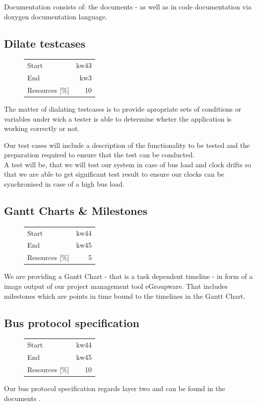 Documentation consists of: the documents \cite [NESD1]{NESD1} - \cite [NESD5]{NESD5} 
as well as in code documentation via doxygen documentation language.

\subsection{Dilate testcases}
\begin{figure}
\begin{tabular}[t]{|lr|}
\hline
Start & kw43\\
End & kw3\\
Resources [\%] & 10\\
\hline
\end{tabular}
\end{figure}
The matter of dialating testcases is to provide apropriate sets of conditions or variables under wich
a tester is able to determine wheter the application is working correctly or not.

Our test cases will include a description of the functionality to be tested and the preparation required
to ensure that the test can be conducted.\\
A test will be, that we will test our system in case of bus load and clock drifts so that we are able to get
significant test result to ensure our clocks can be synchronised in case of a high bus load.

\subsection{Gantt Charts \& Milestones}
\begin{figure}
\begin{tabular}[t]{|lr|}
\hline
Start & kw44\\
End & kw45\\
Resources [\%] & 5\\
\hline
\end{tabular}
\end{figure}
We are providing a Gantt Chart - that is a task dependent timeline - in form of a image output of our 
project management tool eGroupware. That includes milestones which are points 
in time bound to the timelines in the Gantt Chart.
\subsection{Bus protocol specification}
\begin{figure}
\begin{tabular}[t]{|lr|}
\hline
Start & kw44\\
End & kw45\\
Resources [\%] & 10\\
\hline
\end{tabular}
\end{figure}
Our bus protocol specification regards layer two and can be found in the documents \cite [NESD2]{NESD2}.

